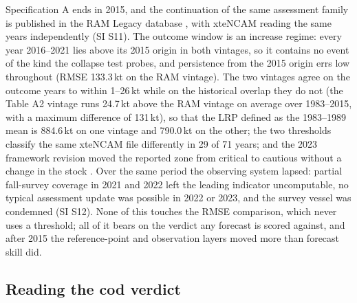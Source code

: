 Specification A ends in 2015, and the continuation of the same assessment family is published in the RAM Legacy database \citep[v4.66, stock COD2J3KL;][]{Ricard2012}, with xteNCAM reading the same years independently (SI S11). The outcome window is an increase regime: every year 2016--2021 lies above its 2015 origin in both vintages, so it contains no event of the kind the collapse test probes, and persistence from the 2015 origin errs low throughout (RMSE 133.3\,kt on the RAM vintage). The two vintages agree on the outcome years to within 1--26\,kt while on the historical overlap they do not (the Table A2 vintage runs 24.7\,kt above the RAM vintage on average over 1983--2015, with a maximum difference of 131\,kt), so that the LRP defined as the 1983--1989 mean is 884.6\,kt on one vintage and 790.0\,kt on the other; the two thresholds classify the same xteNCAM file differently in 29 of 71 years; and the 2023 framework revision moved the reported zone from critical to cautious without a change in the stock \citep{DFO2024a,Regular2025}. Over the same period the observing system lapsed: partial fall-survey coverage in 2021 and 2022 left the leading indicator uncomputable, no typical assessment update was possible in 2022 or 2023, and the survey vessel was condemned (SI S12). None of this touches the RMSE comparison, which never uses a threshold; all of it bears on the verdict any forecast is scored against, and after 2015 the reference-point and observation layers moved more than forecast skill did.

\subsection{Reading the cod verdict}\label{sec:codreading}

